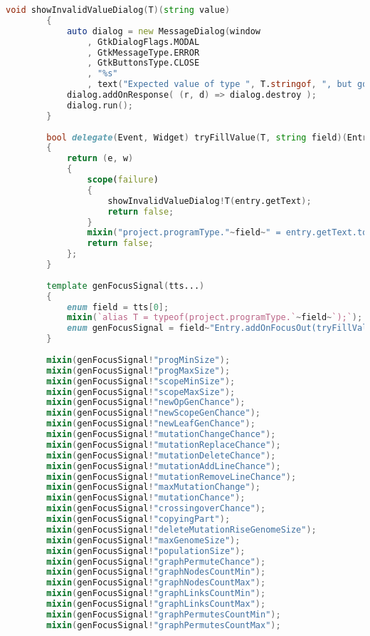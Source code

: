 \documentclass[russian,utf8,emptystyle]{eskdtext}
\begin{document}
\begin{lstlisting}[language=D]
        void showInvalidValueDialog(T)(string value)
        {
            auto dialog = new MessageDialog(window
                , GtkDialogFlags.MODAL
                , GtkMessageType.ERROR
                , GtkButtonsType.CLOSE
                , "%s"
                , text("Expected value of type ", T.stringof, ", but got '", value,"'!"));
            dialog.addOnResponse( (r, d) => dialog.destroy );
            dialog.run();
        }
        
        bool delegate(Event, Widget) tryFillValue(T, string field)(Entry entry)
        {
            return (e, w)
            {
                scope(failure) 
                {
                    showInvalidValueDialog!T(entry.getText);
                    return false;
                }
                mixin("project.programType."~field~" = entry.getText.to!T;");
                return false;
            };
        }
        
        template genFocusSignal(tts...)
        {
            enum field = tts[0];
            mixin(`alias T = typeof(project.programType.`~field~`);`);
            enum genFocusSignal = field~"Entry.addOnFocusOut(tryFillValue!("~T.stringof~`,"`~field~`")(`~field~`Entry));`;
        }
        
        mixin(genFocusSignal!"progMinSize");
        mixin(genFocusSignal!"progMaxSize");
        mixin(genFocusSignal!"scopeMinSize");
        mixin(genFocusSignal!"scopeMaxSize");
        mixin(genFocusSignal!"newOpGenChance");
        mixin(genFocusSignal!"newScopeGenChance");
        mixin(genFocusSignal!"newLeafGenChance");
        mixin(genFocusSignal!"mutationChangeChance");
        mixin(genFocusSignal!"mutationReplaceChance");
        mixin(genFocusSignal!"mutationDeleteChance");
        mixin(genFocusSignal!"mutationAddLineChance");
        mixin(genFocusSignal!"mutationRemoveLineChance");
        mixin(genFocusSignal!"maxMutationChange");
        mixin(genFocusSignal!"mutationChance");
        mixin(genFocusSignal!"crossingoverChance");
        mixin(genFocusSignal!"copyingPart");
        mixin(genFocusSignal!"deleteMutationRiseGenomeSize");
        mixin(genFocusSignal!"maxGenomeSize");
        mixin(genFocusSignal!"populationSize");
        mixin(genFocusSignal!"graphPermuteChance");
        mixin(genFocusSignal!"graphNodesCountMin");
        mixin(genFocusSignal!"graphNodesCountMax");
        mixin(genFocusSignal!"graphLinksCountMin");
        mixin(genFocusSignal!"graphLinksCountMax");
        mixin(genFocusSignal!"graphPermutesCountMin");
        mixin(genFocusSignal!"graphPermutesCountMax");
        

\end{lstlisting}
\end{document}
